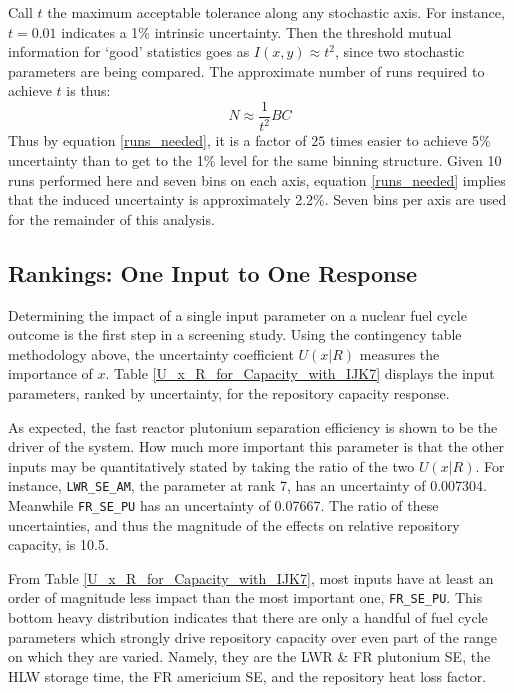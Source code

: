 Call $t$ the maximum acceptable tolerance along any stochastic axis.
For instance, $t = 0.01$ indicates a 1\% intrinsic uncertainty.
Then the threshold mutual information for `good' statistics goes as $I(x,y) \approx t^2$, since
two stochastic parameters are being compared.  The approximate number of runs required to achieve $t$ is thus:
\begin{equation}
\label{runs_needed}
N \approx \frac{1}{t^2} B C
\end{equation}
Thus by equation \ref{runs_needed}, it is a factor of $25$ times easier to achieve 5\% 
uncertainty than to get to the 1\% level for the same binning structure.
Given 10 runs performed here and seven bins on each axis, equation \ref{runs_needed} implies
that the induced uncertainty is approximately 2.2\%.  Seven bins per axis are used for the 
remainder of this analysis.



\subsection{Rankings: One Input to One Response}
\label{cts_sec:rank2D}



Determining the impact of a single input parameter on a nuclear fuel cycle outcome is the 
first step in a screening study.  Using the contingency table methodology above,
the uncertainty coefficient $U(x|R)$ measures the importance of $x$.  
Table \ref{U_x_R_for_Capacity_with_IJK7} displays the input parameters, ranked by
uncertainty, for the repository capacity response.

As expected, the fast reactor plutonium separation efficiency is shown to be the 
driver of the system.  How much more important this parameter is that the
other inputs may be quantitatively stated by taking the ratio of the two $U(x|R)$.  
For instance, \texttt{LWR\_SE\_AM}, the parameter at rank 7,
has an uncertainty of 0.007304.  Meanwhile \texttt{FR\_SE\_PU} has an uncertainty 
of 0.07667.  The ratio of these uncertainties,
and thus the magnitude of the effects on relative repository capacity, is 10.5.

From Table \ref{U_x_R_for_Capacity_with_IJK7}, most inputs have at least an order of magnitude 
less impact than the most important one, \texttt{FR\_SE\_PU}.
This bottom heavy distribution indicates that there are only a handful of fuel cycle 
parameters which strongly drive
repository capacity over even part of the range on which they are varied.
Namely, they are the LWR \& FR plutonium SE, the HLW storage time, the FR americium SE, 
and the repository heat loss factor.

